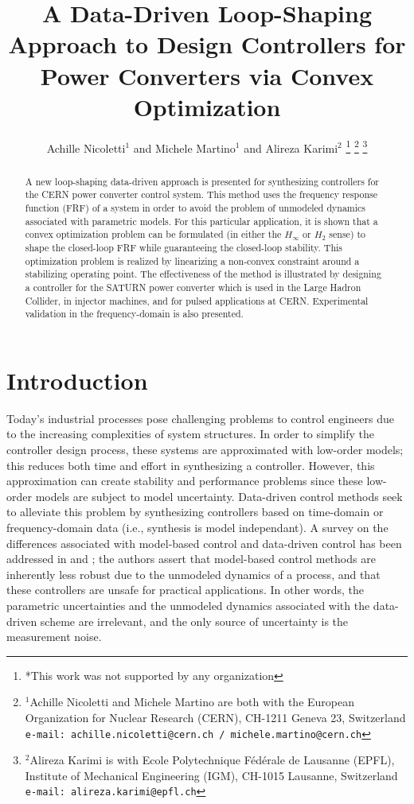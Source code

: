 \documentclass[a4paper, 10pt, conference]{ieeeconf}
\title{A Data-Driven Loop-Shaping Approach to Design Controllers for Power Converters via Convex Optimization}
\author{Achille Nicoletti$^{1}$ and Michele Martino$^{1}$ and Alireza Karimi$^{2}$%
\thanks{*This work was not supported by any organization}%
\thanks{$^{1}$Achille Nicoletti and Michele Martino are both with the European Organization for Nuclear Research (CERN), 
 CH-1211 Geneva 23, Switzerland
        {\tt\small  e-mail: achille.nicoletti@cern.ch / michele.martino@cern.ch}}%
\thanks{$^{2}$Alireza Karimi is with Ecole Polytechnique F\'{e}d\'{e}rale de Lausanne (EPFL), Institute of Mechanical Engineering (IGM),
   CH-1015 Lausanne, Switzerland
        {\tt\small e-mail: alireza.karimi@epfl.ch}}%
}
\begin{document}
\maketitle
\thispagestyle{empty}
\pagestyle{empty}

\begin{abstract}                %
A new loop-shaping data-driven approach is presented for synthesizing controllers for the CERN power converter control system. This method uses the frequency response function (FRF) of a system in order to avoid the problem of unmodeled dynamics associated with parametric models. For this particular application, it is shown that a convex optimization problem can be formulated (in either the $H_\infty$ or $H_2$ sense) to shape the closed-loop FRF while guaranteeing the closed-loop stability. This optimization problem is realized by linearizing a non-convex constraint around a stabilizing operating point. The effectiveness of the method is illustrated by designing a controller for the SATURN power converter which is used in the Large Hadron Collider, in injector machines, and for pulsed applications at CERN. Experimental validation in the frequency-domain is also presented. 
\end{abstract}


\section{Introduction}
Today's industrial processes pose challenging problems to control engineers due to the increasing complexities of system structures. In order to simplify the controller design process, these systems are approximated with low-order models; this reduces both time and effort in synthesizing a controller. However, this approximation can create stability and performance problems since these low-order models are subject to model uncertainty. Data-driven control methods seek to alleviate this problem by synthesizing controllers based on time-domain or frequency-domain data (i.e., synthesis is model independant). A survey on the differences associated with model-based control and data-driven control has been addressed in \cite{HW13} and \cite{BCE12}; the authors assert that model-based control methods are inherently less robust due to the unmodeled dynamics of a process, and that these controllers are unsafe for practical applications. In other words, the parametric uncertainties and the unmodeled dynamics associated with the data-driven scheme are irrelevant, and the only source of uncertainty is the measurement noise. 
\end{document}
